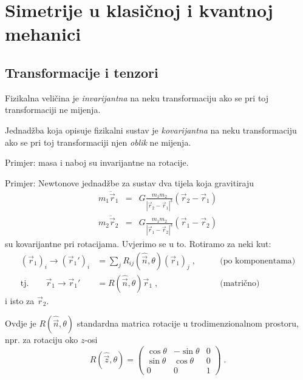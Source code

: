 
\chapter{Simetrije u klasičnoj i kvantnoj mehanici}
\label{ch:klasicna}

\section{Transformacije i tenzori}

\begin{definicija}
Fizikalna veličina je \emph{invarijantna} na neku transformaciju ako se
pri toj transformaciji ne mijenja.

Jednadžba koja opisuje fizikalni sustav je \emph{kovarijantna}
na neku transformaciju ako se pri toj transformaciji 
njen \emph{oblik} ne mijenja.
\end{definicija}

Primjer: masa i naboj su invarijantne na rotacije.

Primjer: Newtonove jednadžbe za sustav dva tijela koja gravitiraju
\begin{eqnarray}
 m_1 \ddot{\vec{r}}_1 & = & G \frac{m_1 m_2}{|\vec{r}_2 - \vec{r}_1|^3}
    (\vec{r}_2 - \vec{r}_1) \label{eq:newton1} \\
 m_2 \ddot{\vec{r}}_2 & = & G \frac{m_1 m_2}{|\vec{r}_1 - \vec{r}_2|^3}
    (\vec{r}_1 - \vec{r}_2)
\end{eqnarray}
su kovarijantne pri rotacijama. Uvjerimo se u to.
Rotiramo za neki kut:
\begin{align*}
(\vec{r}_{1})_i \to (\vec{r}_{1}')_i &= \sum_j R_{ij}(\hat{\vec{n}},\theta) 
   (\vec{r}_{1})_j \;, \qquad& \text{(po komponentama)}\\
\text{tj.}\qquad \vec{r}_{1}\to \vec{r}_{1}' &= R(\hat{\vec{n}},\theta) 
   \vec{r}_{1}\;, \qquad& \text{(matrično)}
\end{align*}
i isto za $\vec{r}_2$.

Ovdje je $R(\hat{\vec{n}},\theta)$ standardna matrica rotacije u trodimenzionalnom
prostoru, npr. za rotaciju oko $z$-osi
\begin{equation}
R(\hat{\vec{z}},\theta) = \begin{pmatrix}
\cos\theta &  -\sin\theta &  0 \\
\sin\theta &  \cos\theta &  0 \\
    0  &       0     &  1 
\end{pmatrix} \;.
\label{eq:matrot}
\end{equation}

